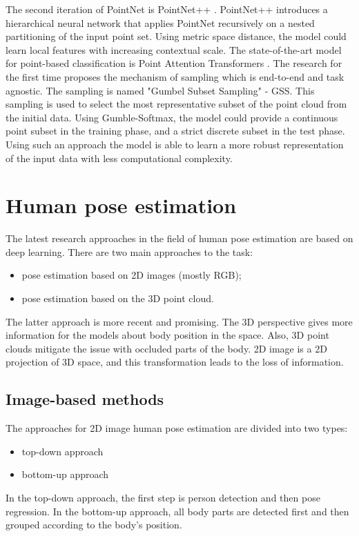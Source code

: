 The second iteration of PointNet is PointNet++ \parencite{qi_pointnet_2017-1}. PointNet++ introduces a hierarchical neural network that applies PointNet recursively on a nested partitioning of the input point set. Using metric space distance, the model could learn local features with increasing contextual scale.
The state-of-the-art model for point-based classification is Point Attention Transformers \parencite{yang_modeling_2019}. The research for the first time proposes the mechanism of sampling which is end-to-end and task agnostic. The sampling is named "Gumbel Subset Sampling" - GSS. This sampling is used to select the most representative subset of the point cloud from the initial data. Using Gumble-Softmax, the model could provide a continuous point subset in the training phase, and a strict discrete subset in the test phase. Using such an approach the model is able to learn a more robust representation of the input data with less computational complexity.

\section{Human pose estimation}
\label{Human pose estimation}
The latest research approaches in the field of human pose estimation are based on deep learning.
There are two main approaches to the task:
\begin{itemize}
  \item pose estimation based on 2D images (mostly RGB);
  \item pose estimation based on the 3D point cloud.
\end{itemize}

The latter approach is more recent and promising. The 3D perspective gives more information for the models about body position in the space. Also, 3D point clouds mitigate the issue with occluded parts of the body. 2D image is a 2D projection of 3D space, and this transformation leads to the loss of information.

\subsection{Image-based methods}
The approaches for 2D image human pose estimation are divided into two types:
\begin{itemize}
  \item top-down approach
  \item bottom-up approach
\end{itemize}
In the top-down approach, the first step is person detection and then pose regression. In the bottom-up approach, all body parts are detected first and then grouped according to the body's position.


